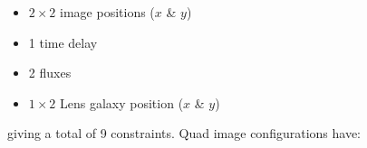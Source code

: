 \begin{itemize}
\item $2\times 2$ image  positions ($x$ \& $y$)
\item 1 time delay 
\item 2 fluxes
\item $1\times 2$ Lens galaxy position ($x$ \& $y$)
\end{itemize}
giving a total of 9 constraints. Quad image configurations have: